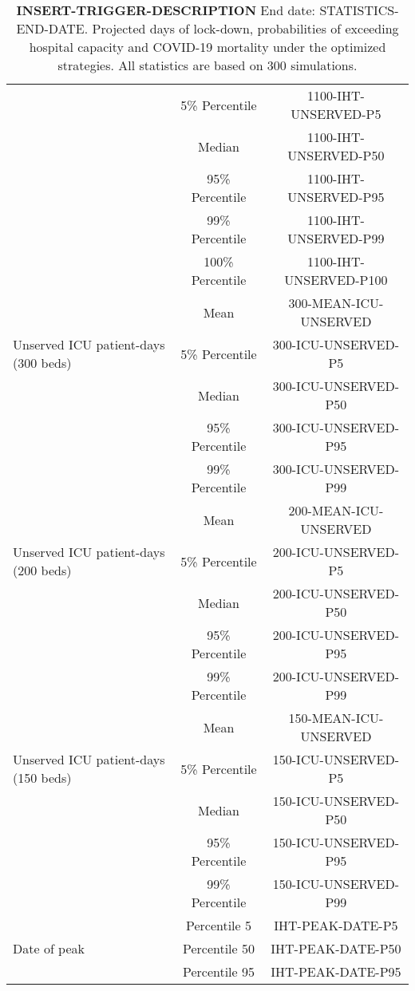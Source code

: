 \documentclass{article}
\begin{document}
\begin{table}[!htb]
\begin{tabular}{p{4cm}cc}
									& 5\% Percentile     & 1100-IHT-UNSERVED-P5    \\ \cmidrule(l){2-3}
									& Median & 1100-IHT-UNSERVED-P50  \\ \cmidrule(l){2-3}  
									& 95\% Percentile     & 1100-IHT-UNSERVED-P95       \\ \cmidrule(l){2-3} 
									& 99\% Percentile     & 1100-IHT-UNSERVED-P99         \\ \cmidrule(l){2-3} 
									& 100\% Percentile     & 1100-IHT-UNSERVED-P100      \\   \midrule 
\multirow{3}{\hsize}{Unserved ICU patient-days (300 beds)} & Mean & 300-MEAN-ICU-UNSERVED  \\ \cmidrule(l){2-3}
									& 5\% Percentile     & 300-ICU-UNSERVED-P5    \\ \cmidrule(l){2-3} 
									& Median & 300-ICU-UNSERVED-P50  \\ \cmidrule(l){2-3} 
									& 95\% Percentile     & 300-ICU-UNSERVED-P95    \\ \cmidrule(l){2-3} 
									& 99\% Percentile     & 300-ICU-UNSERVED-P99   \\  \midrule  							
\multirow{3}{\hsize}{Unserved ICU patient-days (200 beds)} & Mean & 200-MEAN-ICU-UNSERVED  \\ \cmidrule(l){2-3}
& 5\% Percentile     & 200-ICU-UNSERVED-P5    \\ \cmidrule(l){2-3} 
& Median & 200-ICU-UNSERVED-P50  \\ \cmidrule(l){2-3} 
& 95\% Percentile     & 200-ICU-UNSERVED-P95    \\ \cmidrule(l){2-3} 
& 99\% Percentile     & 200-ICU-UNSERVED-P99          \\ \midrule
\multirow{3}{\hsize}{Unserved ICU patient-days (150 beds)} & Mean & 150-MEAN-ICU-UNSERVED  \\ \cmidrule(l){2-3}
& 5\% Percentile     & 150-ICU-UNSERVED-P5    \\ \cmidrule(l){2-3} 
& Median & 150-ICU-UNSERVED-P50  \\ \cmidrule(l){2-3} 
& 95\% Percentile     & 150-ICU-UNSERVED-P95    \\ \cmidrule(l){2-3} 
& 99\% Percentile     & 150-ICU-UNSERVED-P99    \\ \cmidrule(l){2-3} 		
\multirow{3}{\hsize}{Date of peak}   & Percentile 5      & IHT-PEAK-DATE-P5   \\ \cmidrule(l){2-3} 
                                     & Percentile 50     & IHT-PEAK-DATE-P50    \\ \cmidrule(l){2-3} 
                                     & Percentile 95     & IHT-PEAK-DATE-P95     \\  \bottomrule
\end{tabular}
\caption{\textbf{INSERT-TRIGGER-DESCRIPTION}
	End date: STATISTICS-END-DATE. Projected days of lock-down, probabilities of exceeding hospital capacity and COVID-19 mortality under the optimized strategies. All statistics are based on 300 simulations.}
\label{table:summary_table}
\end{table}
\end{document}
